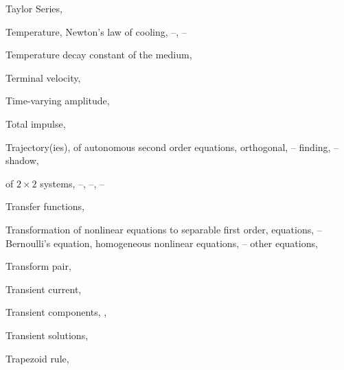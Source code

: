 \begin{theindex}
  \item Taylor Series, \pageref{eq:7.1.2}

  \item Temperature, Newton's law of cooling, \pageref{eq:1.1.5} \pageref{eq:4.2.1}--\pageref{example:4.2.2}, \pageref{exer:4.2.1}--\pageref{exer:4.2.17}

  \item Temperature decay constant of the medium, \pageref{eq:4.2.1}

  \item Terminal velocity, \pageref{example:4.3.1}

  \item Time-varying amplitude, \pageref{eq:6.2.3}

  \item Total impulse, \pageref{exer:8.6.14}

  \item Trajectory(ies),
    \subitem of autonomous second order equations, \pageref{eq:4.4.4}
    \subitem orthogonal, \pageref{figure:4.5.11}--\pageref{exer:4.5.1}
      \subsubitem finding, \pageref{example:4.5.9}--\pageref{exer:5.5.1}
    \subitem shadow, \pageref{eq:10.6.13}

  \item of $2\times2$ systems, \pageref{eq:10.4.18}--\pageref{exer:10.4.1}, \pageref{eq:10.5.19}--\pageref{exer:10.5.1}, \pageref{eq:10.6.10}--\pageref{exer:10.6.1}

  \item Transfer functions, \pageref{thmtype:8.6.3}

  \item Transformation of nonlinear equations to separable first order, equations, \pageref{eq:2.4.1}--\pageref{exer:2.5.29}
    \subitem Bernoulli's equation, \pageref{eq:2.4.2}
    \subitem homogeneous nonlinear equations, \pageref{eq:2.4.7}--\pageref{exer:2.4.1}
    \subitem other equations, \pageref{eq:2.4.4}

  \item Transform pair, \pageref{thmtype:8.1.1}

  \item Transient current, \pageref{example:6.3.2}

  \item Transient components, \pageref{eq:6.2.18}, \pageref{eq:8.6.21}

  \item Transient solutions, \pageref{example:6.3.1}

  \item Trapezoid rule, \pageref{exer:3.2.32}


\end{theindex}
